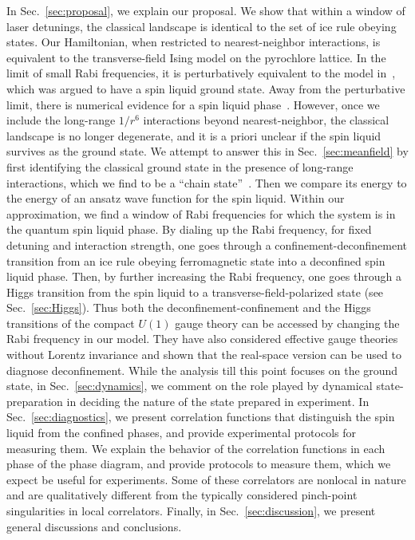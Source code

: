 \documentclass[twocolumn,superscriptaddress,amsmath,amssymb,aps,prx,nofootinbib]{revtex4-2}
\begin{document}
In Sec.~\ref{sec:proposal}, we explain our proposal. We show that within a window of laser detunings, the classical landscape is identical to the set of ice rule obeying states.
Our Hamiltonian, when restricted to nearest-neighbor interactions, is equivalent to the transverse-field Ising model on the pyrochlore lattice. In the limit of small Rabi frequencies, it is perturbatively equivalent to the model in~\cite{hermele2004}, which was argued to have a spin liquid ground state. 
Away from the perturbative limit, there is numerical evidence for a spin liquid phase~\cite{emonts2018monte}. 
However, once we include the long-range $1/r^6$ interactions beyond nearest-neighbor, the classical landscape is no longer degenerate, and it is a priori unclear if the spin liquid survives as the ground state. 
We attempt to answer this in Sec.~\ref{sec:meanfield} by first identifying  the classical ground state in the presence of long-range interactions, which we find to be a ``chain state''~\cite{mcclarty2015chain}. Then we compare its energy to the energy of an ansatz wave function for the spin liquid. 
Within our approximation, we find a window of Rabi frequencies for which the system is in the quantum spin liquid phase. By dialing up the Rabi frequency, for fixed detuning and interaction strength, one goes through a confinement-deconfinement transition from an ice rule obeying ferromagnetic state into a deconfined spin liquid phase. Then, by further increasing the Rabi frequency, one goes through a Higgs transition from the spin liquid to a transverse-field-polarized state (see Sec.~\ref{sec:Higgs}). 
Thus both the deconfinement-confinement and the Higgs transitions of the compact $U(1)$ gauge theory can be accessed by changing the Rabi frequency in our model.
They have also considered effective gauge theories without Lorentz invariance and shown that the real-space version can be used to diagnose deconfinement.
While the analysis till this point focuses on the ground state, in Sec.~\ref{sec:dynamics}, we comment on the role played by dynamical state-preparation in deciding the nature of the state prepared in experiment. 
In Sec.~\ref{sec:diagnostics}, we present correlation functions that distinguish the spin liquid from the confined phases, and provide experimental protocols for measuring them.
We explain the behavior of the correlation functions in each phase of the phase diagram, and provide protocols to measure them, which we expect be useful for experiments. Some of these correlators are nonlocal in nature and are qualitatively different from the typically considered pinch-point singularities in local correlators.
Finally, in Sec.~\ref{sec:discussion}, we present general discussions and conclusions.
\end{document}
